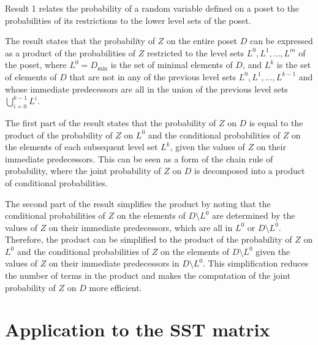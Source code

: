 \documentclass[11pt]{amsart}
\begin{document}
Result 1 relates the probability of a random variable defined on a poset to the probabilities of its restrictions to the lower level sets of the poset.

The result states that the probability of $Z$ on the entire poset $D$ can be expressed as a product of the probabilities of $Z$ restricted to the level sets $L^0, L^1, \ldots, L^m$ of the poset, where $L^0 = D_{\text{min}}$ is the set of minimal elements of $D$, and $L^k$ is the set of elements of $D$ that are not in any of the previous level sets $L^0, L^1, \ldots, L^{k-1}$ and whose immediate predecessors are all in the union of the previous level sets $\bigcup_{i=0}^{k-1} L^i$.

The first part of the result states that the probability of $Z$ on $D$ is equal to the product of the probability of $Z$ on $L^0$ and the conditional probabilities of $Z$ on the elements of each subsequent level set $L^k$, given the values of $Z$ on their immediate predecessors. This can be seen as a form of the chain rule of probability, where the joint probability of $Z$ on $D$ is decomposed into a product of conditional probabilities.

The second part of the result simplifies the product by noting that the conditional probabilities of $Z$ on the elements of $D\setminus L^0$ are determined by the values of $Z$ on their immediate predecessors, which are all in $L^0$ or $D\setminus L^0$. Therefore, the product can be simplified to the product of the probability of $Z$ on $L^0$ and the conditional probabilities of $Z$ on the elements of $D\setminus L^0$ given the values of $Z$ on their immediate predecessors in $D\setminus L^0$. This simplification reduces the number of terms in the product and makes the computation of the joint probability of $Z$ on $D$ more efficient.




\newpage







\section{Application to the SST matrix}
\end{document}
